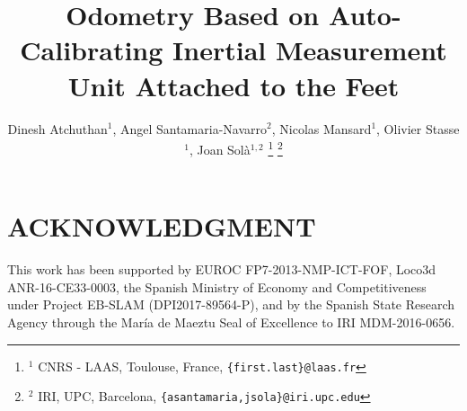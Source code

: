 \documentclass[letterpaper, 10 pt, conference]{ieeeconf}  %
\title{\LARGE \bf
Odometry Based on Auto-Calibrating Inertial Measurement Unit Attached to the Feet
}
\author{Dinesh Atchuthan$^{1}$, Angel Santamaria-Navarro$^{2}$, Nicolas Mansard$^1$, Olivier Stasse$^1$, Joan Sol\`a$^{1,2}$%
\thanks{$^{1}$ CNRS - LAAS, Toulouse, France, \tt {\footnotesize \{first.last\}@laas.fr}}%
\thanks{$^{2}$ IRI, UPC, Barcelona, \tt{\footnotesize \{asantamaria,jsola\}@iri.upc.edu}}
}
\begin{document}
\maketitle
\thispagestyle{empty}
\pagestyle{empty}

\begin{abstract}

\end{abstract}









\section*{ACKNOWLEDGMENT}
This work has been supported by EUROC FP7-2013-NMP-ICT-FOF, 
Loco3d ANR-16-CE33-0003, 
the Spanish Ministry of Economy and Competitiveness under Project EB-SLAM (DPI2017-89564-P), 
and by the Spanish State Research Agency through the María de Maeztu Seal of Excellence to IRI MDM-2016-0656.



\end{document}

